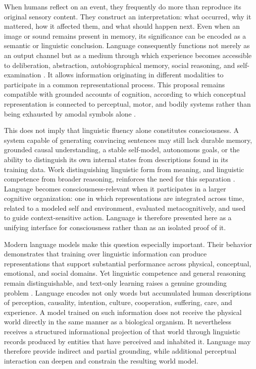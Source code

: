 When humans reflect on an event, they frequently do more than reproduce its original sensory content. They construct an interpretation: what occurred, why it mattered, how it affected them, and what should happen next. Even when an image or sound remains present in memory, its significance can be encoded as a semantic or linguistic conclusion. Language consequently functions not merely as an output channel but as a medium through which experience becomes accessible to deliberation, abstraction, autobiographical memory, social reasoning, and self-examination \cite{aldersonday2015inner}. It allows information originating in different modalities to participate in a common representational process. This proposal remains compatible with grounded accounts of cognition, according to which conceptual representation is connected to perceptual, motor, and bodily systems rather than being exhausted by amodal symbols alone \cite{barsalou2008grounded,harnad1990symbol}.

This does not imply that linguistic fluency alone constitutes consciousness. A system capable of generating convincing sentences may still lack durable memory, grounded causal understanding, a stable self-model, autonomous goals, or the ability to distinguish its own internal states from descriptions found in its training data. Work distinguishing linguistic form from meaning, and linguistic competence from broader reasoning, reinforces the need for this separation \cite{bender2020climbing,mahowald2024dissociating}. Language becomes consciousness-relevant when it participates in a larger cognitive organization: one in which representations are integrated across time, related to a modeled self and environment, evaluated metacognitively, and used to guide context-sensitive action. Language is therefore presented here as a unifying interface for consciousness rather than as an isolated proof of it.

Modern language models make this question especially important. Their behavior demonstrates that training over linguistic information can produce representations that support substantial performance across physical, conceptual, emotional, and social domains. Yet linguistic competence and general reasoning remain distinguishable, and text-only learning raises a genuine grounding problem \cite{harnad1990symbol,bender2020climbing,mahowald2024dissociating}. Language encodes not only words but accumulated human descriptions of perception, causality, intention, culture, cooperation, suffering, care, and experience. A model trained on such information does not receive the physical world directly in the same manner as a biological organism. It nevertheless receives a structured informational projection of that world through linguistic records produced by entities that have perceived and inhabited it. Language may therefore provide indirect and partial grounding, while additional perceptual interaction can deepen and constrain the resulting world model.

